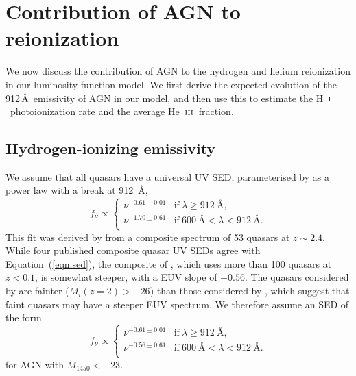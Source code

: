 \documentclass[fleqn,usenatbib]{mnras}
\def\HI{\hbox{H~$\scriptstyle\rm I$}}
\def\HeIII{\hbox{He~$\scriptstyle\rm III$}}
\def\HeIII{\hbox{He~$\scriptstyle\rm III$}}
\begin{document}
\section{Contribution of AGN to reionization}
\label{sec:reion}

We now discuss the contribution of AGN to the hydrogen and helium
reionization in our luminosity function model.  We first derive the
expected evolution of the 912\,\AA\ emissivity of AGN in our model,
and then use this to estimate the \HI\ photoionization rate and the
average \HeIII\ fraction.

\subsection{Hydrogen-ionizing emissivity}
\label{sec:e912}

We assume that all quasars have a universal UV SED, parameterised by
\citet{2015MNRAS.449.4204L} as a power law with a break at 912~{\AA},
\begin{equation}
  f_\nu\propto\begin{cases}
  \nu^{-0.61\pm 0.01} & \text{if}~\lambda\geq 912~\text{\AA},\\
  \nu^{-1.70\pm 0.61} & \text{if}~600~\text{\AA}<\lambda<912~\text{\AA}.\\                
  \end{cases}
  \label{eqn:sed}
\end{equation}
This fit was derived by \citet{2015MNRAS.449.4204L} from a composite
spectrum of 53 quasars at $z\sim 2.4$.  While four published composite
quasar UV SEDs \citep{2002ApJ...565..773T, 2001AJ....122..549V,
  2012ApJ...752..162S, 2014ApJ...794...75S} agree with
Equation~(\ref{eqn:sed}), the composite of
\citet{2004ApJ...615..135S}, which uses more than 100 quasars at
$z<0.1$, is somewhat steeper, with a EUV slope of $-0.56$.  The
quasars considered by \citet{2004ApJ...615..135S} are fainter
($M_i(z=2)>-26$) than those considered by \citet{2015MNRAS.449.4204L},
which suggest that faint quasars may have a steeper EUV spectrum.  We
therefore assume an SED of the form
\begin{equation}
  f_\nu\propto\begin{cases}
  \nu^{-0.61\pm 0.01} & \text{if}~\lambda\geq 912~\text{\AA},\\
  \nu^{-0.56\pm 0.61} & \text{if}~600~\text{\AA}<\lambda<912~\text{\AA}.\\                
  \end{cases}
  \label{eqn:sed_faint}
\end{equation}
for AGN with $M_{1450}<-23$.
\end{document}
